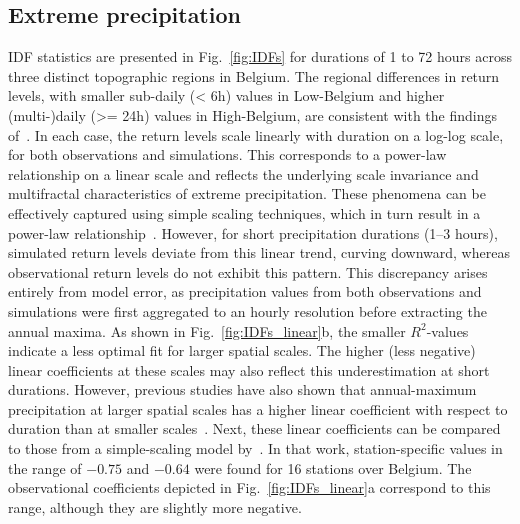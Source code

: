 \documentclass[journal abbreviation, manuscript]{copernicus}
\begin{document}
\subsection{Extreme precipitation}

IDF statistics are presented in Fig.~\ref{fig:IDFs} for durations of 1 to 72 hours across three distinct topographic regions in Belgium.
The regional differences in return levels, with smaller sub-daily (< 6h) values in Low-Belgium and higher (multi-)daily (>= 24h) values in High-Belgium, are consistent with the findings of~\citet{van_de_vyver_practical_2013}.
In each case, the return levels scale linearly with duration on a log-log scale, for both observations and simulations.
This corresponds to a power-law relationship on a linear scale and reflects the underlying scale invariance and multifractal characteristics of extreme precipitation.
These phenomena can be effectively captured using simple scaling techniques, which in turn result in a power-law relationship~\citep{gupta_multiscaling_1990, veneziano_multifractality_2002}.
However, for short precipitation durations (1--3 hours), simulated return levels deviate from this linear trend, curving downward, whereas observational return levels do not exhibit this pattern.
This discrepancy arises entirely from model error, as precipitation values from both observations and simulations were first aggregated to an hourly resolution before extracting the annual maxima.
As shown in Fig.~\ref{fig:IDFs_linear}b, the smaller $R^2$-values indicate a less optimal fit for larger spatial scales.
The higher (less negative) linear coefficients at these scales may also reflect this underestimation at short durations.
However, previous studies have also shown that annual-maximum precipitation at larger spatial scales has a higher linear coefficient with respect to duration than at smaller scales~\citep{innocenti_observed_2019}.
Next, these linear coefficients can be compared to those from a simple-scaling model by~\citet{van_de_vyver_multiscalingbased_2018}.
In that work, station-specific values in the range of $-0.75$ and $-0.64$ were found for 16 stations over Belgium.
The observational coefficients depicted in Fig.~\ref{fig:IDFs_linear}a correspond to this range, although they are slightly more negative.
\end{document}
